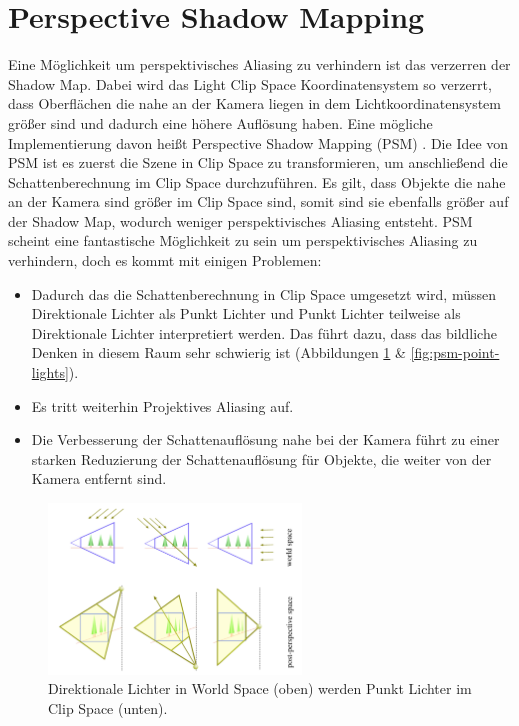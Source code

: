 \section{Perspective Shadow Mapping}
\label{section:psm}
Eine Möglichkeit um perspektivisches Aliasing zu verhindern ist das verzerren 
der Shadow Map. 
Dabei wird das Light Clip Space Koordinatensystem so verzerrt, dass Oberflächen die nahe an der Kamera liegen in dem
Lichtkoordinatensystem größer sind und dadurch eine höhere Auflösung haben.
\newline
Eine mögliche Implementierung davon heißt Perspective Shadow Mapping (PSM) \cite{PSM2002}.
Die Idee von PSM ist es zuerst die Szene in Clip Space zu transformieren, um anschließend die Schattenberechnung 
im Clip Space durchzuführen.
Es gilt, dass Objekte die nahe an der Kamera sind größer im Clip Space sind, somit sind sie ebenfalls größer auf der Shadow Map, wodurch weniger perspektivisches 
Aliasing entsteht.
PSM scheint eine fantastische Möglichkeit zu sein um perspektivisches Aliasing zu verhindern,
doch es kommt mit einigen Problemen:
\begin{itemize}
  \item Dadurch das die Schattenberechnung in Clip Space umgesetzt wird,
    müssen Direktionale Lichter als Punkt Lichter und Punkt Lichter teilweise als Direktionale Lichter interpretiert werden.
    Das führt dazu, dass das bildliche Denken in diesem Raum sehr schwierig ist (Abbildungen \ref{fig:psm-dir-lights} \& \ref{fig:psm-point-lights}).
  \item Es tritt weiterhin Projektives Aliasing auf.
  \item Die Verbesserung der Schattenauflösung nahe bei der Kamera führt zu einer starken Reduzierung der Schattenauflösung
    für Objekte, die weiter von der Kamera entfernt sind.
\end{itemize}
\begin{figure}
	\begin{center}
    \includegraphics[width=0.6\textwidth]{res/img/psm_dir_lights.png}
    \caption{Direktionale Lichter in World Space (oben) werden Punkt Lichter im Clip Space (unten).}
	  \label{fig:psm-dir-lights}
	\end{center}
\end{figure}
